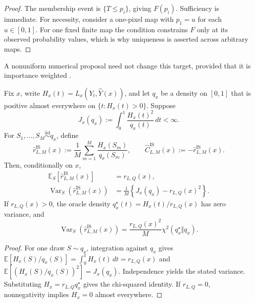 \begin{proof}
The membership event is \(\{T\leq p_i\}\), giving \(F(p_i)\). Sufficiency is
immediate. For necessity, consider a one-pixel map with \(p_1=u\) for each
\(u\in[0,1]\). For one fixed finite map the condition constrains \(F\) only at
its observed probability values, which is why uniqueness is asserted across
arbitrary maps.
\end{proof}

A nonuniform numerical proposal need not change this target, provided that it
is importance weighted \citep{kahn1953,owen2000safe}.

\begin{proposition}
\label{app:prop:importance-thresholds}
Fix \(x\), write \(H_x(t)=L_x(Y_t,\widehat Y(x))\), and let \(q_x\) be a
density on \([0,1]\) that is positive almost everywhere on
\(\{t:H_x(t)>0\}\). Suppose
\begin{equation*}
  J_x(q_x):=\int_0^1\frac{H_x(t)^2}{q_x(t)}\,dt<\infty.
\end{equation*}
For \(S_1,\ldots,S_M\stackrel{\mathrm{iid}}{\sim}q_x\), define
\begin{equation*}
  \widehat r^{\mathrm{IS}}_{L,M}(x)
  :=\frac1M\sum_{m=1}^M\frac{H_x(S_m)}{q_x(S_m)},
  \qquad
  \widehat C^{\mathrm{IS}}_{L,M}(x)
  :=-\widehat r^{\mathrm{IS}}_{L,M}(x).
\end{equation*}
Then, conditionally on \(x\),
\begin{align*}
  \mathbb E_S[\widehat r^{\mathrm{IS}}_{L,M}(x)]
  &=r_{L,Q}(x),\\
  \operatorname{Var}_S(\widehat r^{\mathrm{IS}}_{L,M}(x))
  &=\frac1M\left\{J_x(q_x)-r_{L,Q}(x)^2\right\}.
\end{align*}
If \(r_{L,Q}(x)>0\), the oracle density
\(q_x^\star(t)=H_x(t)/r_{L,Q}(x)\) has zero variance, and
\begin{equation*}
  \operatorname{Var}_S(\widehat r^{\mathrm{IS}}_{L,M}(x))
  =\frac{r_{L,Q}(x)^2}{M}
    \chi^2(q_x^\star\Vert q_x).
\end{equation*}
\end{proposition}

\begin{proof}
For one draw \(S\sim q_x\), integration against \(q_x\) gives
\(\mathbb E[H_x(S)/q_x(S)]=\int_0^1H_x(t)\,dt=r_{L,Q}(x)\) and
\(\mathbb E[(H_x(S)/q_x(S))^2]=J_x(q_x)\). Independence yields the stated
variance. Substituting \(H_x=r_{L,Q}q_x^\star\) gives the chi-squared identity.
If \(r_{L,Q}=0\), nonnegativity implies \(H_x=0\) almost everywhere.
\end{proof}

